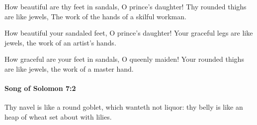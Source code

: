 			\begin{versebox}
					\item[BHS] 
					\item[LXX] 
					\item[ASV] How beautiful are thy feet in sandals, O prince's daughter! Thy rounded thighs are like jewels, The work of the hands of a skilful workman.
					\item[NIV] How beautiful your sandaled feet, O prince’s daughter! Your graceful legs are like jewels, the work of an artist’s hands.
					\item[NRSV] How graceful are your feet in sandals, O queenly maiden! Your rounded thighs are like jewels, the work of a master hand.
			\end{versebox}

		\paragraph{Song of Solomon 7:2} %
			\label{SONGOFSOLOMON-7-2}

			Thy navel is like a round goblet, which wanteth not liquor: thy belly is like an heap of wheat set about with lilies.

